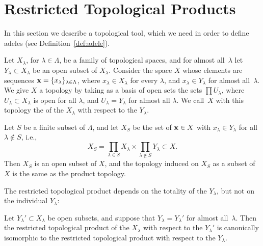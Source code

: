 \section{Restricted Topological Products}

In this section we describe a topological tool, which we need in order
to define adeles (see Definition~\ref{def:adele}).

\begin{definition}
  Let $X_\lambda$, for $\lambda\in\Lambda$, be a family of topological
  spaces, and for almost all~$\lambda$ let $Y_{\lambda}\subset
  X_{\lambda}$ be an open subset of $X_{\lambda}$.  Consider the space
  $X$ whose elements are sequences $\mathbf{x} = \{x_\lambda\}_{\lambda\in
    \Lambda}$, where $x_\lambda\in X_\lambda$ for every $\lambda$, and
  $x_\lambda\in Y_{\lambda}$ for almost all~$\lambda$.  We give $X$ a
  topology by taking as a basis of open sets the sets $\prod
  U_{\lambda}$, where $U_{\lambda}\subset X_{\lambda}$ is open for all
  $\lambda$, and $U_{\lambda} = Y_{\lambda}$ for almost all $\lambda$.
  We call~$X$ with this topology the  of the $X_{\lambda}$ with respect to the $Y_{\lambda}$.
\end{definition}


\begin{corollary}\label{lem:xs}
  Let $S$ be a finite subset of $\Lambda$, and let $X_S$ be the set of
  $\mathbf{x}\in X$ with $x_\lambda\in Y_\lambda$ for all $\lambda\not\in S$,
  i.e.,
  $$
  X_S = \prod_{\lambda \in S} X_{\lambda} \times
  \prod_{\lambda\not\in S} Y_{\lambda} \subset X.
  $$
  Then $X_S$ is an open subset of $X$, and the topology induced on
  $X_S$ as a subset of $X$ is the same as the product topology.
\end{corollary}

The restricted topological product depends on the totality of the
$Y_{\lambda}$, but not on the individual $Y_{\lambda}$:
\begin{lemma}
  Let $Y_{\lambda}'\subset X_{\lambda}$ be open subsets, and suppose
  that $Y_{\lambda} = Y_{\lambda}'$ for almost all~$\lambda$.  Then
  the restricted topological product of the $X_\lambda$ with respect
  to the $Y_{\lambda}'$ is canonically isomorphic to the restricted
  topological product with respect to the $Y_{\lambda}$.
\end{lemma}

